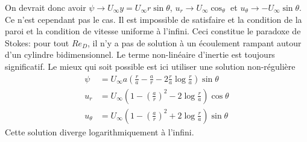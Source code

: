     On devrait donc avoir $\psi \rightarrow U_\infty y = U_\infty r \sin \theta$, $u_r \rightarrow U_\infty \cos_\theta$ et $u_\theta \rightarrow -U_\infty \sin \theta$. Ce n'est cependant pas le cas. Il est impossible de satisfaire et la condition de la paroi et la condition de vitesse uniforme à l'infini. Ceci constitue le paradoxe de Stokes: pour tout $Re_D$, il n'y a pas de solution à un écoulement rampant autour d'un cylindre bidimensionnel. Le terme non-linéaire d'inertie est toujours significatif. Le mieux qui soit possible est ici utiliser une solution non-régulière
    \begin{equation}
      \begin{aligned}
        \psi &= U_\infty a \left(\frac{r}{a} - \frac{a}{r} - 2 \frac{r}{a} \log \frac{r}{a}\right) \sin{\theta}\\
        u_r &= U_\infty \left(1 - \left(\frac{a}{r}\right)^2 - 2 \log \frac{r}{a}\right) \cos{\theta}\\
        u_\theta &= U_\infty \left(1 - \left(\frac{a}{r}\right)^2 + 2 \log \frac{r}{a}\right) \sin{\theta}
      \end{aligned}
    \end{equation}
    Cette solution diverge logarithmiquement à l'infini.

